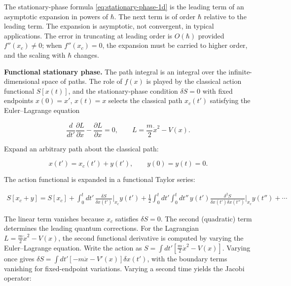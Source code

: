 \begin{note}
The stationary-phase formula \eqref{eq:stationary-phase-1d} is the leading term of an asymptotic expansion in powers of $\hbar$. The next term is of order $\hbar$ relative to the leading term. The expansion is asymptotic, not convergent, in typical applications. The error in truncating at leading order is $O(\hbar)$ provided $f''(x_c) \neq 0$; when $f''(x_c) = 0$, the expansion must be carried to higher order, and the scaling with $\hbar$ changes.
\end{note}

\medskip\noindent\textbf{Functional stationary phase.}
The path integral is an integral over the infinite-dimensional space of paths. The role of $f(x)$ is played by the classical action functional $S[x(t)]$, and the stationary-phase condition $\delta S = 0$ with fixed endpoints $x(0) = x'$, $x(t) = x$ selects the classical path $x_c(t')$ satisfying the Euler--Lagrange equation
\begin{linenomath}
\begin{equation}
\frac{d}{dt'}\frac{\partial L}{\partial \dot{x}} - \frac{\partial L}{\partial x} = 0,
\qquad L = \frac{m}{2}\dot{x}^2 - V(x).
\end{equation}
\end{linenomath}
Expand an arbitrary path about the classical path:
\begin{linenomath}
\begin{equation}
x(t') = x_c(t') + y(t'), \qquad y(0) = y(t) = 0.
\end{equation}
\end{linenomath}
The action functional is expanded in a functional Taylor series:
\begin{linenomath}
\begin{align}
S[x_c + y] = S[x_c] + \int_0^t dt'\, \frac{\delta S}{\delta x(t')}\bigg|_{x_c}\! y(t')
+ \frac{1}{2}\int_0^t dt'\int_0^t dt''\, y(t') \frac{\delta^2 S}{\delta x(t')\delta x(t'')}\bigg|_{x_c}\! y(t'')
+ \cdots
\end{align}
\end{linenomath}
The linear term vanishes because $x_c$ satisfies $\delta S = 0$. The second (quadratic) term determines the leading quantum corrections. For the Lagrangian $L = \frac{m}{2}\dot{x}^2 - V(x)$, the second functional derivative is computed by varying the Euler--Lagrange equation. Write the action as $S = \int dt' [\frac{m}{2}\dot{x}^2 - V(x)]$. Varying once gives $\delta S = \int dt' [-m\ddot{x} - V'(x)]\delta x(t')$, with the boundary terms vanishing for fixed-endpoint variations. Varying a second time yields the Jacobi operator:
